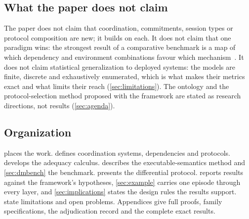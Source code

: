 \subsection{What the paper does not claim}

The paper does not claim that coordination, commitments, session types or protocol composition are new; it builds on each. It does not claim that one paradigm wins: the strongest result of a comparative benchmark is a map of which dependency and environment combinations favour which mechanism~\cite{malone1994interdisciplinary}. It does not claim statistical generalization to deployed systems: the models are finite, discrete and exhaustively enumerated, which is what makes their metrics exact and what limits their reach (\cref{sec:limitations}). The ontology and the protocol-selection method proposed with the framework are stated as research directions, not results (\cref{sec:agenda}).

\subsection{Organization}

 places the work.  defines coordination systems, dependencies and protocols.  develops the adequacy calculus.  describes the executable-semantics method and \cref{sec:dmbench} the benchmark.  presents the differential protocol.  reports results against the framework's hypotheses, \cref{sec:example} carries one episode through every layer, and \cref{sec:implications} states the design rules the results support.  state limitations and open problems. Appendices give full proofs, family specifications, the adjudication record and the complete exact results.
